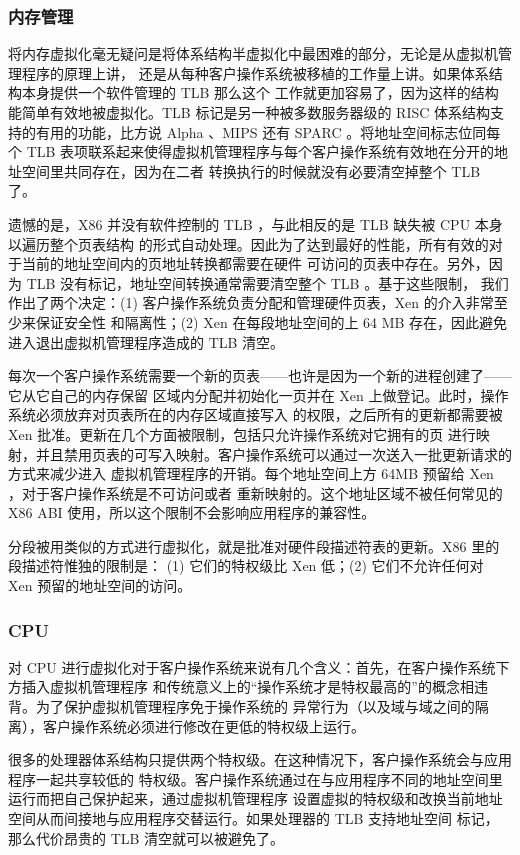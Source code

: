 \subsubsection{内存管理}

将内存虚拟化毫无疑问是将体系结构半虚拟化中最困难的部分，无论是从虚拟机管理程序的原理上讲，
还是从每种客户操作系统被移植的工作量上讲。如果体系结构本身提供一个软件管理的 TLB 那么这个
工作就更加容易了，因为这样的结构能简单有效地被虚拟化。TLB 标记是另一种被多数服务器级的 RISC
体系结构支持的有用的功能，比方说 Alpha 、MIPS 还有 SPARC 。将地址空间标志位同每个 TLB
表项联系起来使得虚拟机管理程序与每个客户操作系统有效地在分开的地址空间里共同存在，因为在二者
转换执行的时候就没有必要清空掉整个 TLB 了。

遗憾的是，X86 并没有软件控制的 TLB ，与此相反的是 TLB 缺失被 CPU 本身以遍历整个页表结构
的形式自动处理。因此为了达到最好的性能，所有有效的对于当前的地址空间内的页地址转换都需要在硬件
可访问的页表中存在。另外，因为 TLB 没有标记，地址空间转换通常需要清空整个 TLB 。基于这些限制，
我们作出了两个决定：(1) 客户操作系统负责分配和管理硬件页表，Xen 的介入非常至少来保证安全性
和隔离性；(2) Xen 在每段地址空间的上 64 MB 存在，因此避免进入退出虚拟机管理程序造成的 TLB
清空。

每次一个客户操作系统需要一个新的页表——也许是因为一个新的进程创建了——它从它自己的内存保留
区域内分配并初始化一页并在 Xen 上做登记。此时，操作系统必须放弃对页表所在的内存区域直接写入
的权限，之后所有的更新都需要被 Xen 批准。更新在几个方面被限制，包括只允许操作系统对它拥有的页
进行映射，并且禁用页表的可写入映射。客户操作系统可以通过一次送入一批更新请求的方式来减少进入
虚拟机管理程序的开销。每个地址空间上方 64MB 预留给 Xen ，对于客户操作系统是不可访问或者
重新映射的。这个地址区域不被任何常见的 X86 ABI 使用，所以这个限制不会影响应用程序的兼容性。

分段被用类似的方式进行虚拟化，就是批准对硬件段描述符表的更新。X86 里的段描述符惟独的限制是：
(1) 它们的特权级比 Xen 低；(2) 它们不允许任何对 Xen 预留的地址空间的访问。

\subsubsection{CPU}

对 CPU 进行虚拟化对于客户操作系统来说有几个含义：首先，在客户操作系统下方插入虚拟机管理程序
和传统意义上的“操作系统才是特权最高的”的概念相违背。为了保护虚拟机管理程序免于操作系统的
异常行为（以及域与域之间的隔离），客户操作系统必须进行修改在更低的特权级上运行。

很多的处理器体系结构只提供两个特权级。在这种情况下，客户操作系统会与应用程序一起共享较低的
特权级。客户操作系统通过在与应用程序不同的地址空间里运行而把自己保护起来，通过虚拟机管理程序
设置虚拟的特权级和改换当前地址空间从而间接地与应用程序交替运行。如果处理器的 TLB 支持地址空间
标记，那么代价昂贵的 TLB 清空就可以被避免了。

